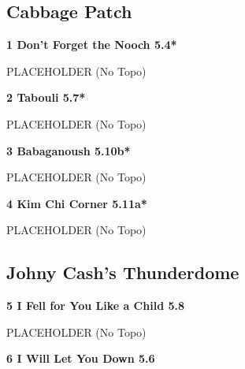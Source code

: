 \begin{multicols}{2}
	
			\subsection*{Cabbage Patch}\label{bf:Cabbage Patch}
						
					\label{rt:Don't Forget the Nooch}
\colorbox{green!20}{
\parbox{0.95\linewidth}{
\textbf{
1 Don't Forget the Nooch 5.4*  
}
}
}

					\begin{adjustwidth}{0.5cm}{}				
					PLACEHOLDER
						\newline (No Topo) 
					\end{adjustwidth}
					\label{rt:Tabouli}
\colorbox{green!20}{
\parbox{0.95\linewidth}{
\textbf{
2 Tabouli 5.7*  
}
}
}

					\begin{adjustwidth}{0.5cm}{}				
					PLACEHOLDER
						\newline (No Topo) 
					\end{adjustwidth}
					\label{rt:Babaganoush}
\colorbox{RoyalBlue!20}{
\parbox{0.95\linewidth}{
\textbf{
3 Babaganoush 5.10b*  
}
}
}

					\begin{adjustwidth}{0.5cm}{}				
					PLACEHOLDER
						\newline (No Topo) 
					\end{adjustwidth}
					\label{rt:Kim Chi Corner}
\colorbox{RoyalBlue!20}{
\parbox{0.95\linewidth}{
\textbf{
4 Kim Chi Corner 5.11a*  
}
}
}

					\begin{adjustwidth}{0.5cm}{}				
					PLACEHOLDER
						\newline (No Topo) 
					\end{adjustwidth}
			\subsection*{Johny Cash's Thunderdome}\label{bf:Johny Cash's Thunderdome}
						
					\label{rt:I Fell for You Like a Child}
\colorbox{green!20}{
\parbox{0.95\linewidth}{
\textbf{
5 I Fell for You Like a Child 5.8     
}
}
}

					\begin{adjustwidth}{0.5cm}{}				
					PLACEHOLDER
						\newline (No Topo) 
					\end{adjustwidth}
					\label{rt:I Will Let You Down}
\colorbox{green!20}{
\parbox{0.95\linewidth}{
\textbf{
6 I Will Let You Down 5.6    
}
}
}


\end{multicols}
